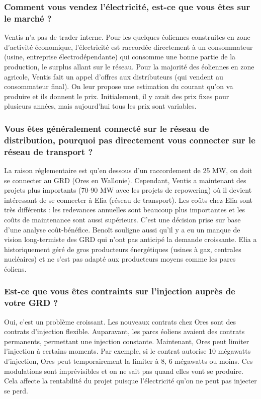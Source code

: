 \subsubsection{Comment vous vendez l'électricité, est-ce que vous êtes sur le marché ?}

Ventis n'a pas de trader interne. Pour les quelques éoliennes construites en zone d'activité économique, l'électricité est raccordée directement à un consommateur (usine, entreprise électrodépendante) qui consomme une bonne partie de la production, le surplus allant sur le réseau. Pour la majorité des éoliennes en zone agricole, Ventis fait un appel d'offres aux distributeurs (qui vendent au consommateur final). On leur propose une estimation du courant qu'on va produire et ils donnent le prix. Initialement, il y avait des prix fixes pour plusieurs années, mais aujourd'hui tous les prix sont variables.

\subsubsection{Vous êtes généralement connecté sur le réseau de distribution, pourquoi pas directement vous connecter sur le réseau de transport ?}

La raison réglementaire est qu'en dessous d'un raccordement de 25 MW, on doit se connecter au GRD (Ores en Wallonie). Cependant, Ventis a maintenant des projets plus importants (70-90 MW avec les projets de repowering) où il devient intéressant de se connecter à Elia (réseau de transport). Les coûts chez Elia sont très différents : les redevances annuelles sont beaucoup plus importantes et les coûts de maintenance sont aussi supérieurs. C'est une décision prise sur base d'une analyse coût-bénéfice. Benoît souligne aussi qu'il y a eu un manque de vision long-termiste des GRD qui n'ont pas anticipé la demande croissante. Elia a historiquement géré de gros producteurs énergétiques (usines à gaz, centrales nucléaires) et ne s'est pas adapté aux producteurs moyens comme les parcs éoliens.

\subsubsection{Est-ce que vous êtes contraints sur l'injection auprès de votre GRD ?}

Oui, c'est un problème croissant. Les nouveaux contrats chez Ores sont des contrats d'injection flexible. Auparavant, les parcs éoliens avaient des contrats permanents, permettant une injection constante. Maintenant, Ores peut limiter l'injection à certains moments. Par exemple, si le contrat autorise 10 mégawatts d'injection, Ores peut temporairement la limiter à 8, 6 mégawatts ou moins. Ces modulations sont imprévisibles et on ne sait pas quand elles vont se produire. Cela affecte la rentabilité du projet puisque l'électricité qu'on ne peut pas injecter se perd.

